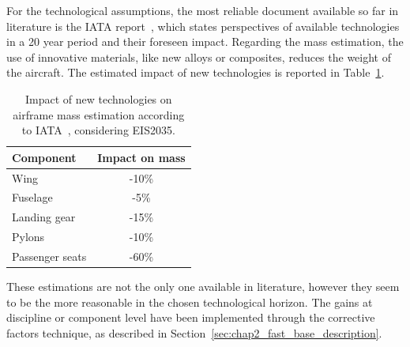 For the technological assumptions, the most reliable document available so far in literature is the IATA report~\cite{bib:iata, bib:iata_annex}, which states perspectives of available technologies in a 20 year period and their foreseen impact. 
Regarding the mass estimation, the use of innovative materials, like new alloys or composites, reduces the weight of the aircraft. 
The estimated impact of new technologies is reported in Table~\ref{tab:2035_mass_impact}. 
\begin{table}[!h]
	\centering
	\begin{tabular}{l c}
		\hline
		\textbf{Component} & \textbf{Impact on mass} \\
		\hline
		Wing & -10\% \\
		Fuselage & -5\% \\
		Landing gear & -15\% \\
		Pylons & -10\% \\
		Passenger seats & -60\% \\
		\hline
	\end{tabular}
	\caption{Impact of new technologies on airframe mass estimation according to IATA~\cite{bib:iata_annex}, considering EIS2035.}
	\label{tab:2035_mass_impact}
\end{table}
These estimations are not the only one available in literature, however they seem to be the more reasonable in the chosen technological horizon. 
The gains at discipline or component level have been implemented through the corrective factors technique, as described in Section~\ref{sec:chap2_fast_base_description}. 

